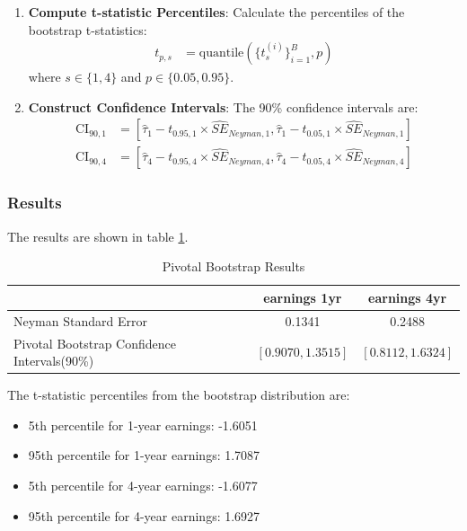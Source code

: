 \documentclass[11pt]{article}
\numberwithin{equation}{section}
\begin{document}
\begin{algorithm}
\begin{enumerate}
        \item \textbf{Compute t-statistic Percentiles}: Calculate the percentiles of the bootstrap t-statistics:
        \begin{align}
            t_{p,s} &= \text{quantile}(\{t^{(i)}_s\}_{i=1}^B, p) 
        \end{align}
        where $s \in \{1, 4\}$ and $p \in \{0.05, 0.95\}$.
        
        \item \textbf{Construct Confidence Intervals}: The 90\% confidence intervals are:
        \begin{align}
            \text{CI}_{90,1} &= [\hat{\tau}_1 - t_{0.95,1} \times \hat{SE}_{Neyman,1}, \hat{\tau}_1 - t_{0.05,1} \times \hat{SE}_{Neyman,1}] \\
            \text{CI}_{90,4} &= [\hat{\tau}_4 - t_{0.95,4} \times \hat{SE}_{Neyman,4}, \hat{\tau}_4 - t_{0.05,4} \times \hat{SE}_{Neyman,4}]
        \end{align}
    \end{enumerate}
\end{algorithm}



\subsubsection{Results}

The results are shown in table \ref{tab:pivotal_bootstrap_results}.

\begin{table}[h]
    \centering
    \begin{tabular}{lcc}
        \hline
         & earnings 1yr & earnings 4yr \\
        \hline
        Neyman Standard Error & 0.1341 & 0.2488 \\
        Pivotal Bootstrap Confidence Intervals(90\%) & $[0.9070, 1.3515]$ & $[0.8112, 1.6324]$ \\
        \hline
    \end{tabular}
    \caption{\label{tab:pivotal_bootstrap_results}Pivotal Bootstrap Results}
\end{table}

The t-statistic percentiles from the bootstrap distribution are:
\begin{itemize}
    \item 5th percentile for 1-year earnings: -1.6051
    \item 95th percentile for 1-year earnings: 1.7087
    \item 5th percentile for 4-year earnings: -1.6077
    \item 95th percentile for 4-year earnings: 1.6927
\end{itemize}
\end{document}
